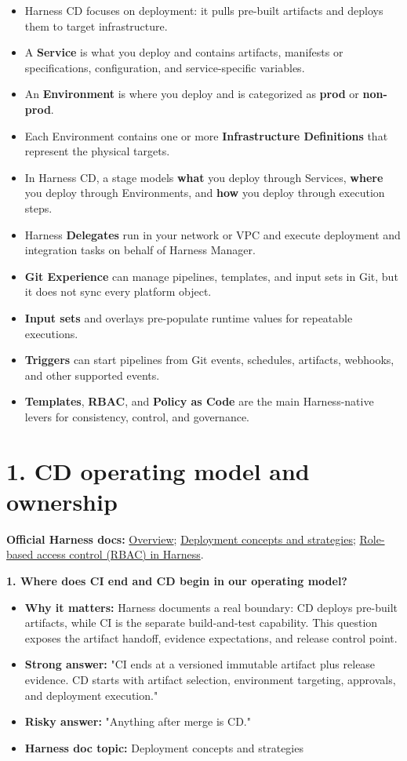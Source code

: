 \documentclass[11pt]{article}
\newcommand{\doccluster}[1]{%
  {\small\textcolor{AccentGray}{\textbf{Official Harness docs:} #1}}\par\vspace{0.4em}
}
\newcommand{\qblock}[5]{%
  \textbf{#1}\par
  \begin{itemize}[leftmargin=1.5em,itemsep=0.2em,topsep=0.3em]
    \item[--] \textbf{Why it matters:} #2
    \item[--] \textbf{Strong answer:} #3
    \item[--] \textbf{Risky answer:} #4
    \item[--] \textbf{Harness doc topic:} #5
  \end{itemize}
  \vspace{0.4em}
}
\begin{document}
\begin{itemize}[leftmargin=1.5em,itemsep=0.25em]
  \item Harness CD focuses on deployment: it pulls pre-built artifacts and deploys them to target infrastructure.
  \item A \textbf{Service} is what you deploy and contains artifacts, manifests or specifications, configuration, and service-specific variables.
  \item An \textbf{Environment} is where you deploy and is categorized as \textbf{prod} or \textbf{non-prod}.
  \item Each Environment contains one or more \textbf{Infrastructure Definitions} that represent the physical targets.
  \item In Harness CD, a stage models \textbf{what} you deploy through Services, \textbf{where} you deploy through Environments, and \textbf{how} you deploy through execution steps.
  \item Harness \textbf{Delegates} run in your network or VPC and execute deployment and integration tasks on behalf of Harness Manager.
  \item \textbf{Git Experience} can manage pipelines, templates, and input sets in Git, but it does not sync every platform object.
  \item \textbf{Input sets} and overlays pre-populate runtime values for repeatable executions.
  \item \textbf{Triggers} can start pipelines from Git events, schedules, artifacts, webhooks, and other supported events.
  \item \textbf{Templates}, \textbf{RBAC}, and \textbf{Policy as Code} are the main Harness-native levers for consistency, control, and governance.
\end{itemize}

\section*{1. CD operating model and ownership}
\doccluster{\href{https://developer.harness.io/docs/continuous-delivery/overview}{Overview}; \href{https://developer.harness.io/docs/continuous-delivery/manage-deployments/deployment-concepts}{Deployment concepts and strategies}; \href{https://developer.harness.io/docs/platform/role-based-access-control/rbac-in-harness/}{Role-based access control (RBAC) in Harness}.}

\qblock{1. Where does CI end and CD begin in our operating model?}{Harness documents a real boundary: CD deploys pre-built artifacts, while CI is the separate build-and-test capability. This question exposes the artifact handoff, evidence expectations, and release control point.}{"CI ends at a versioned immutable artifact plus release evidence. CD starts with artifact selection, environment targeting, approvals, and deployment execution."}{"Anything after merge is CD."}{Deployment concepts and strategies}
\end{document}
